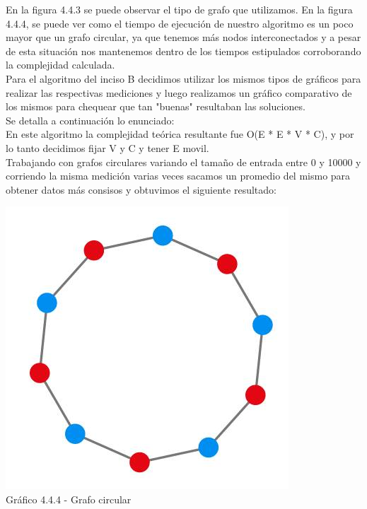 En la figura 4.4.3 se puede observar el tipo de grafo que utilizamos. En la figura 4.4.4, se puede ver como el tiempo de ejecución de nuestro algoritmo es un poco mayor que un grafo circular, ya que tenemos más nodos interconectados y a pesar de esta situación nos mantenemos dentro de los tiempos estipulados corroborando la complejidad calculada.\\


Para el algoritmo del inciso B decidimos utilizar los mismos tipos de gráficos para realizar las respectivas mediciones y luego realizamos un gráfico comparativo de los mismos para chequear que tan "buenas" resultaban las soluciones.\\

Se detalla a continuación lo enunciado:\\

En este algoritmo la complejidad teórica resultante fue O(E * E * V * C), y por lo tanto decidimos fijar V y C y tener E movil.\\

Trabajando con grafos circulares variando el tamaño de entrada entre 0 y 10000 y corriendo la misma medición varias veces sacamos un promedio del mismo para obtener datos  más consisos y obtuvimos el siguiente resultado:

\vspace*{0.3cm} \vspace*{0.3cm}
  \begin{center}
 \includegraphics[scale=0.5]{./ej4/circular.jpg}
 	{\\Gráfico 4.4.4 - Grafo circular}
  \end{center}
  \vspace*{0.3cm}
  
